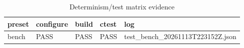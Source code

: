 \begin{table}
\caption{Determinism/test matrix evidence}
\label{tab:determinism_matrix}
\begin{tabular}{lllll}
\toprule
preset & configure & build & ctest & log \\
\midrule
bench & PASS & PASS & PASS & test\_bench\_20261113T223152Z.json \\
\bottomrule
\end{tabular}
\end{table}

